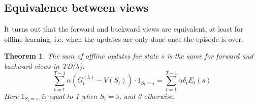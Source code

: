 \documentclass[12pt, a4paper]{article}
\newtheorem{theorem}{Theorem}[section]
\numberwithin{equation}{section}
\begin{document}
\subsection{Equivalence between views}
It turns out that the forward and backward views are equivalent, at least for offline learning, i.e. when the updates are only done once the episode is over.

\begin{theorem}
The sum of offline updates for state $s$ is the same for forward and backward views in TD($\lambda$):
\begin{equation}
\sum_{t=1}^{T-1}\alpha\left(G^{(\lambda)}_t-V(S_t)\right)\cdot 1_{S_t=s}=\sum_{t=1}^{T-1}\alpha\delta_t E_t(s)
\end{equation}
Here $1_{S_t=s}$ is equal to 1 when $S_t=s$, and 0 otherwise.
\end{theorem}
\end{document}
